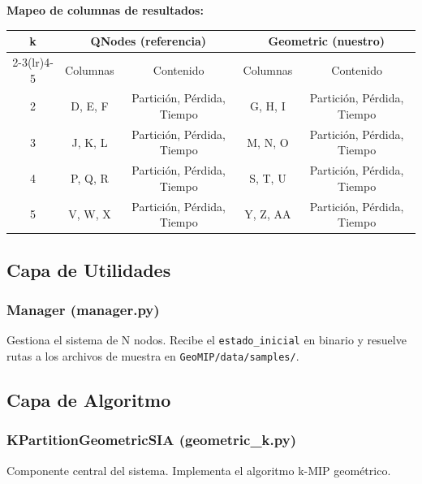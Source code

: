 \documentclass[12pt,a4paper]{article}
\begin{document}
\textbf{Mapeo de columnas de resultados:}
\begin{longtable}{ccccc}
    \toprule
    k & \multicolumn{2}{c}{QNodes (referencia)} & \multicolumn{2}{c}{Geometric (nuestro)} \\
    \cmidrule(lr){2-3}\cmidrule(lr){4-5}
      & Columnas & Contenido & Columnas & Contenido \\
    \midrule
    \endhead
    2 & D, E, F & Partición, Pérdida, Tiempo & G, H, I & Partición, Pérdida, Tiempo \\
    3 & J, K, L & Partición, Pérdida, Tiempo & M, N, O & Partición, Pérdida, Tiempo \\
    4 & P, Q, R & Partición, Pérdida, Tiempo & S, T, U & Partición, Pérdida, Tiempo \\
    5 & V, W, X & Partición, Pérdida, Tiempo & Y, Z, AA & Partición, Pérdida, Tiempo \\
    \bottomrule
\end{longtable}

\subsection{Capa de Utilidades}

\subsubsection{Manager (manager.py)}
Gestiona el sistema de N nodos. Recibe el \texttt{estado\_inicial} en binario y resuelve rutas a los archivos de muestra en \texttt{GeoMIP/data/samples/}.

\subsection{Capa de Algoritmo}

\subsubsection{KPartitionGeometricSIA (geometric\_k.py)}
Componente central del sistema. Implementa el algoritmo k-MIP geométrico.
\end{document}
